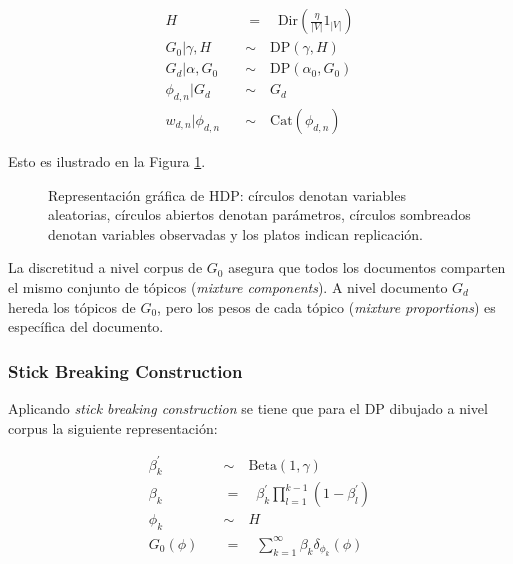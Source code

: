 \documentclass[letterpaper,12pt,oneside]{book} %
\begin{document}
\begin{align}
   H \quad &= \quad \text{Dir}(\frac{\eta}{|V|}1_{|V|})\\
   G_{0}|\gamma, H \quad &\sim \quad \text{DP}(\gamma, H)\\
   G_{d}|\alpha, G_{0} \quad &\sim \quad \text{DP}(\alpha_{0}, G_{0})\\
   \phi_{d,n}|G_{d} \quad &\sim \quad G_{d}\\
   w_{d,n}|\phi_{d,n} \quad &\sim \quad \text{Cat}(\phi_{d,n})
\end{align}

Esto es ilustrado en la Figura \ref{img:hdp}.

\begin{figure}
  \centering
\caption{Representación gráfica de HDP: círculos denotan variables aleatorias, círculos abiertos denotan parámetros, círculos sombreados denotan variables observadas y los platos indican replicación.}
\label{img:hdp}
\end{figure}

La discretitud a nivel corpus de $G_{0}$ asegura que todos los documentos comparten el mismo conjunto de tópicos (\textit{mixture components}). A nivel documento $G_{d}$ hereda los tópicos de $G_{0}$, pero los pesos de cada tópico (\textit{mixture proportions}) es específica del documento.\\


\subsubsection{Stick Breaking Construction}
Aplicando \textit{stick breaking construction} se tiene que para el DP dibujado a nivel corpus la siguiente representación:

\begin{align}
    \beta_{k}^{'} \quad &\sim \quad \text{Beta}(1, \gamma) \\
    \beta_{k} \quad &= \quad \beta_{k}^{'}\prod_{l=1}^{k-1}(1-\beta_{l}^{'})\\
    \phi_{k} \quad &\sim \quad H  \\
    G_{0}(\phi) \quad &= \quad \sum_{k=1}^{\infty}\beta_{k}\delta_{\phi_{k}}(\phi)
\end{align}
\end{document}
